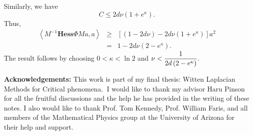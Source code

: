 \documentclass{article}
\begin{document}
Similarly, we have 
\begin{equation*}
C\leq 2d\nu \left( 1+e^{\kappa }\right) .
\end{equation*}%
Thus, 
\begin{eqnarray*}
\left\langle M^{-1}\mathbf{Hess}\Phi Ma,a\right\rangle  &\geq &\left[ \left(
1-2d\nu \right) -2d\nu \left( 1+e^{\kappa }\right) \right] a^{2} \\
&=&1-2d\nu \left( 2-e^{\kappa }\right) .
\end{eqnarray*}%
The result follows by choosing $0<\kappa <\ln 2$ and $\nu <\dfrac{1}{%
2d\left( 2-e^{\kappa }\right) }.$

\textbf{Acknowledgements:} This work is part of my final thesis: Witten
Laplacian Methods for Critical phenomena.\textbf{\ }I would like to thank my
advisor Haru Pinson for all the fruitful discussions and the help he has
provided in the writing of these notes. I also would like to thank Prof. Tom
Kennedy, Prof. William Faris, and all members of the Mathematical Physics
group at the University of Arizona for their help and support.
\end{document}
